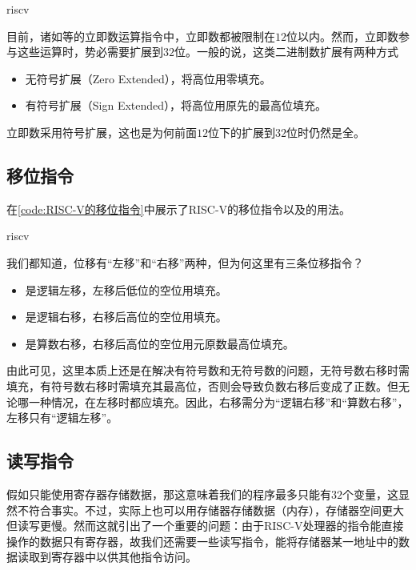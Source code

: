 \begin{Code}{riscv}
    
\end{Code}

目前，诸如等的立即数运算指令中，立即数都被限制在$12$位以内。然而，立即数参与这些运算时，势必需要扩展到$32$位。一般的说，这类二进制数扩展有两种方式
\begin{itemize}
    \item 无符号扩展（Zero Extended），将高位用零填充。
    \item 有符号扩展（Sign Extended），将高位用原先的最高位填充。
\end{itemize}

立即数采用符号扩展，这也是为何前面$12$位下的扩展到$32$位时仍然是全。

\subsection{移位指令}
在\cref{code:RISC-V的移位指令}中展示了RISC-V的移位指令以及的用法。
\begin{Code}{riscv}
    
\end{Code}

我们都知道，位移有“左移”和“右移”两种，但为何这里有三条位移指令？
\begin{itemize}
    \item {}是逻辑左移，左移后低位的空位用填充。
    \item {}是逻辑右移，右移后高位的空位用填充。
    \item {}是算数右移，右移后高位的空位用元原数最高位填充。
\end{itemize}
由此可见，这里本质上还是在解决有符号数和无符号数的问题，无符号数右移时需填充，有符号数右移时需填充其最高位，否则会导致负数右移后变成了正数。但无论哪一种情况，在左移时都应填充。因此，右移需分为“逻辑右移”和“算数右移”，左移只有“逻辑左移”。

\subsection{读写指令}
假如只能使用寄存器存储数据，那这意味着我们的程序最多只能有$32$个变量，这显然不符合事实。不过，实际上也可以用存储器存储数据（内存），存储器空间更大但读写更慢。然而这就引出了一个重要的问题：由于RISC-V处理器的指令能直接操作的数据只有寄存器，故我们还需要一些读写指令，能将存储器某一地址中的数据读取到寄存器中以供其他指令访问。

